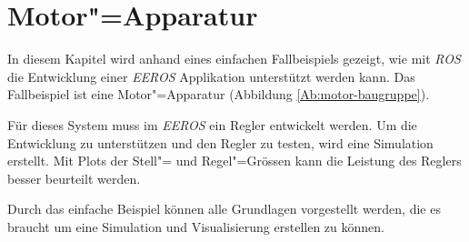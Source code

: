 \chapter{Motor"=Apparatur}
\label{chap:motor}


In diesem Kapitel wird anhand eines einfachen Fallbeispiels gezeigt, wie mit \textit{ROS} die Entwicklung einer \textit{EEROS} Applikation unterstützt werden kann. 
Das Fallbeispiel ist eine Motor"=Apparatur (Abbildung \ref{Ab:motor-baugruppe}).

Für dieses System muss im \textit{EEROS} ein Regler entwickelt werden.
Um die Entwicklung zu unterstützen und den Regler zu testen, wird eine Simulation erstellt.
Mit Plots der Stell"= und Regel"=Grössen kann die Leistung des Reglers besser beurteilt werden.


Durch das einfache Beispiel können alle Grundlagen vorgestellt werden, die es braucht um eine Simulation und Visualisierung erstellen zu können.


